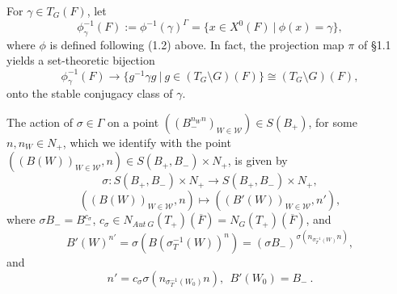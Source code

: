 \documentclass[12pt,letterpaper]{amsart}
\newcommand{\ovF}{\overline{F}}
\begin{document}
For $\gamma\in T_G(F)$, let
\[
\phi_\gamma^{-1}(F):=\phi^{-1}(\gamma)^\Gamma=
\{x\in X^0(F)\ |\ \phi(x)=\gamma\},
\]
where $\phi$ is defined following (1.2) above.
In fact, the projection map $\pi$ of \S 1.1
yields a set-theoretic bijection
\[
\phi_\gamma^{-1}(F)
\rightarrow \{g^{-1}\gamma g\ |\ g\in (T_G\setminus G)(F)\}
\cong (T_G\setminus G)(F),
\tag{2.3}
\]
onto the stable conjugacy class of $\gamma$.

The action of $\sigma\in\Gamma$ on a point
$((B_-^{n_Wn})_{W\in{\mathcal W}})\in
S(B_+)$, for some
$n,n_W\in N_+$, which we identify with the point
$((B(W))_{W\in{\mathcal W}},n)\in S(B_+,B_-)\times N_+$,
is given by
\[
\sigma: S(B_+,B_-)\times N_+ \rightarrow S(B_+,B_-)\times N_+,
\]
\[
((B(W))_{W\in{\mathcal W}},n)\longmapsto
((B'(W))_{W\in{\mathcal W}},n'),
\tag{2.4a}
\]
where $\sigma B_-=B_-^{c_\sigma}$,
$c_\sigma\in N_{Aut\ G}(T_+)(\ovF)=N_G(T_+)(\ovF)$, and
\[
B'(W)^{n'}=\sigma(B(\sigma_T^{-1}(W))^n)=
(\sigma B_-)^{\sigma(n_{\sigma_T^{-1}(W)}n)},
\tag{2.4b}
\]
and
\[
n'=c_\sigma\sigma(n_{\sigma_T^{-1}(W_0)}n),\ \ B'(W_0)= B_- \ .
\tag{2.4c}
\]
\end{document}
